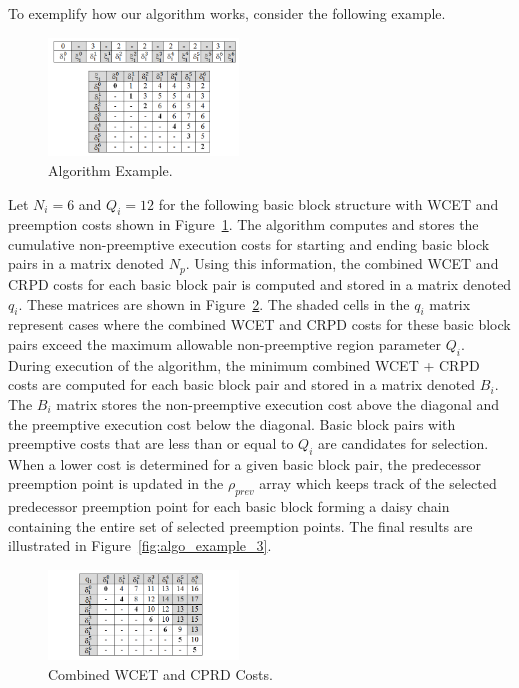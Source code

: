 To exemplify how our algorithm works, consider the following example.
\begin{figure}[h!]
\vspace{-10pt}
\begin{center}
\includegraphics[width=0.45\textwidth]{algo_example.png}
\caption{Algorithm Example.}
\label{fig:algo_example}
\end{center}
\vspace{-10pt}
\end{figure}
Let $N_i=6$ and $Q_i=12$ for the following basic block structure with WCET and preemption costs shown in Figure~\ref{fig:algo_example}.  The algorithm computes and stores the cumulative non-preemptive execution costs for starting and ending basic block pairs in a matrix denoted $N_p$.  Using this information, the combined WCET and CRPD costs for each basic block pair is computed and stored in a matrix denoted $q_{i}$.  These matrices are shown in Figure~\ref{fig:algo_example_2}.  The shaded cells in the $q_{i}$ matrix represent cases where the combined WCET and CRPD costs for these basic block pairs exceed the maximum allowable non-preemptive region parameter $Q_i$.  During execution of the algorithm, the minimum combined WCET + CRPD costs are computed for each basic block pair and stored in a matrix denoted $B_{i}$.  The $B_{i}$ matrix stores the non-preemptive execution cost above the diagonal and the preemptive execution cost below the diagonal.  Basic block pairs with preemptive costs that are less than or equal to $Q_i$ are candidates for selection.  When a lower cost is determined for a given basic block pair, the predecessor preemption point is updated in the $\rho_{prev}$ array which keeps track of the selected predecessor preemption point for each basic block forming a daisy chain containing the entire set of selected preemption points.  The final results are illustrated in Figure~\ref{fig:algo_example_3}.
\begin{figure}[h!]
\vspace{-10pt}
\begin{center}
\includegraphics[width=0.45\textwidth]{algo_example_2.png}
\caption{Combined WCET and CPRD Costs.}
\label{fig:algo_example_2}
\end{center}
\vspace{-10pt}
\end{figure}

